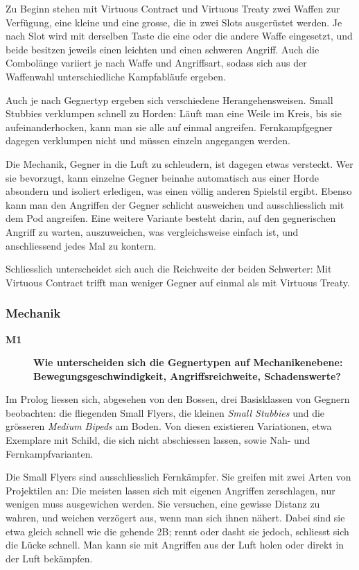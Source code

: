 \documentclass[../Main.tex]{subfiles}
\begin{document}
Zu Beginn stehen mit Virtuous Contract und Virtuous Treaty zwei Waffen zur Verfügung, eine kleine und eine grosse, die in zwei Slots ausgerüstet werden. Je nach Slot wird mit derselben Taste die eine oder die andere Waffe eingesetzt, und beide besitzen jeweils einen leichten und einen schweren Angriff. Auch die Combolänge variiert je nach Waffe und Angriffsart, sodass sich aus der Waffenwahl unterschiedliche Kampfabläufe ergeben.

Auch je nach Gegnertyp ergeben sich verschiedene Herangehensweisen. Small Stubbies verklumpen schnell zu Horden: Läuft man eine Weile im Kreis, bis sie aufeinanderhocken, kann man sie alle auf einmal angreifen. Fernkampfgegner dagegen verklumpen nicht und müssen einzeln angegangen werden.

Die Mechanik, Gegner in die Luft zu schleudern, ist dagegen etwas versteckt. Wer sie bevorzugt, kann einzelne Gegner beinahe automatisch aus einer Horde absondern und isoliert erledigen, was einen völlig anderen Spielstil ergibt. Ebenso kann man den Angriffen der Gegner schlicht ausweichen und ausschliesslich mit dem Pod angreifen. Eine weitere Variante besteht darin, auf den gegnerischen Angriff zu warten, auszuweichen, was vergleichsweise einfach ist, und anschliessend jedes Mal zu kontern.

Schliesslich unterscheidet sich auch die Reichweite der beiden Schwerter: Mit Virtuous Contract trifft man weniger Gegner auf einmal als mit Virtuous Treaty.

\subsubsection{Mechanik}

\begin{description}
  \item[\textbf{M1}] \textbf{Wie unterscheiden sich die Gegnertypen auf Mechanikenebene: Bewegungsgeschwindigkeit, Angriffsreichweite, Schadenswerte?}
\end{description}

Im Prolog liessen sich, abgesehen von den Bossen, drei Basisklassen von Gegnern beobachten: die fliegenden Small Flyers, die kleinen \textit{Small Stubbies} und die grösseren \textit{Medium Bipeds} am Boden. Von diesen existieren Variationen, etwa Exemplare mit Schild, die sich nicht abschiessen lassen, sowie Nah- und Fernkampfvarianten.

Die Small Flyers sind ausschliesslich Fernkämpfer. Sie greifen mit zwei Arten von Projektilen an: Die meisten lassen sich mit eigenen Angriffen zerschlagen, nur wenigen muss ausgewichen werden. Sie versuchen, eine gewisse Distanz zu wahren, und weichen verzögert aus, wenn man sich ihnen nähert. Dabei sind sie etwa gleich schnell wie die gehende 2B; rennt oder dasht sie jedoch, schliesst sich die Lücke schnell. Man kann sie mit Angriffen aus der Luft holen oder direkt in der Luft bekämpfen.
\end{document}
